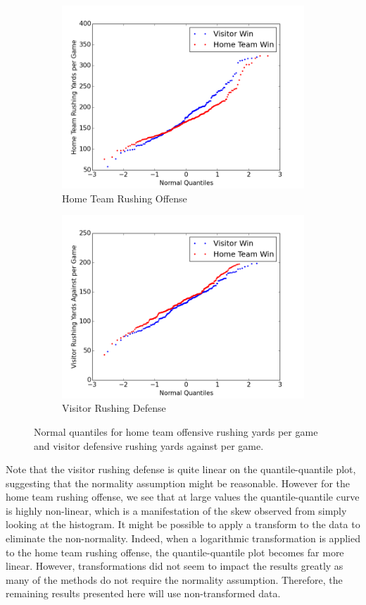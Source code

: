 \documentclass[12pt]{article}
\begin{document}
\begin{figure}[ht!]
	\centering
	\begin{subfigure}{.5\textwidth}
		\centering
		\includegraphics[width=.9\linewidth]{figs/homeRushOff_norm.png}
		\caption{Home Team Rushing Offense}
		\label{fig::homeRushOff_qq}
	\end{subfigure}%
	\begin{subfigure}{.5\textwidth}
		\centering
		\includegraphics[width=.9\linewidth]{figs/visitorRushDef_norm.png}
		\caption{Visitor Rushing Defense}
		\label{fig::visitorRushDef_qq}
	\end{subfigure}
	\caption{Normal quantiles for home team offensive rushing yards per game and visitor defensive rushing yards against per game.}
	\label{fig::QQ}
\end{figure}

Note that the visitor rushing defense is quite linear on the quantile-quantile plot, suggesting that the normality assumption might be reasonable. However for the home team rushing offense, we see that at large values the quantile-quantile curve is highly non-linear, which is a manifestation of the skew observed from simply looking at the histogram. It might be possible to apply a transform to the data to eliminate the non-normality. Indeed, when a logarithmic transformation is applied to the home team rushing offense, the quantile-quantile plot becomes far more linear. However, transformations did not seem to impact the results greatly as many of the methods do not require the normality assumption. Therefore, the remaining results presented here will use non-transformed data.
\end{document}
